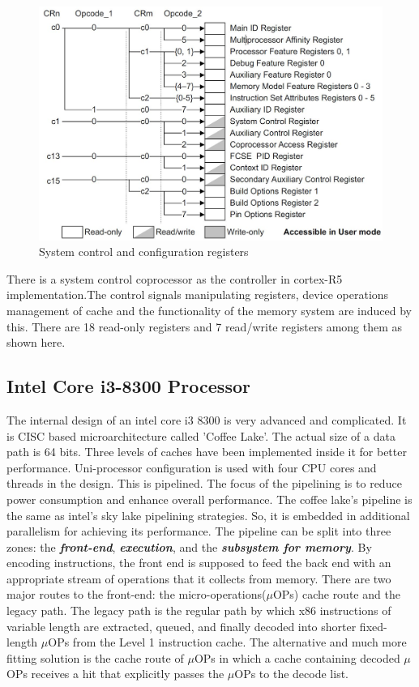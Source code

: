 \documentclass[a4paper,11pt]{article}
\begin{document}
\begin{figure}[!h]
	\centering
	\includegraphics[scale= 0.3]{figures/syscc}
	\caption{System control and configuration registers}
\end{figure}

There is a system control coprocessor as the controller in cortex-R5 implementation.The control signals manipulating registers, device operations management of cache and the functionality of the memory system are induced by this. There are 18 read-only registers and 7 read/write registers among them as shown here.


\subsection{Intel Core i3-8300 Processor}
The internal design of an intel core i3 8300 is very advanced and complicated. It is CISC based microarchitecture called 'Coffee Lake'.  The actual size of a data path is 64 bits. Three levels of caches have been implemented inside it for better performance. Uni-processor configuration is used with four CPU cores and threads in the design. This is pipelined. The focus of the pipelining is to reduce power consumption and enhance overall performance. The coffee lake's pipeline is the same as intel's sky lake pipelining strategies. So, it is embedded in additional parallelism for achieving its performance. The pipeline can be split into three zones: the \textbf{\textit{front-end}}, \textit{\textbf{execution}}, and the \textbf{\textit{subsystem for memory}}. By encoding instructions, the front end is supposed to feed the back end with an appropriate stream of operations that it collects from memory. There are two major routes to the front-end: the micro-operations($\mu$OPs) cache route and the legacy path. The legacy path is the regular path by which x86 instructions of variable length are extracted, queued, and finally decoded into shorter fixed-length $\mu$OPs from the Level 1 instruction cache. The alternative and much more fitting solution is the cache route of $\mu$OPs in which a cache containing decoded $\mu$OPs receives a hit that explicitly passes the $\mu$OPs to the decode list.\\
\end{document}
